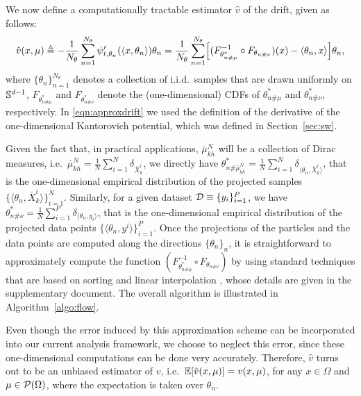 We now define a computationally tractable estimator $\hat{v}$ of the drift, given as follows:
\begin{align}
\hat{v}(x,\mu) \triangleq - \frac1{N_\theta} \sum_{n=1}^{N_\theta} \psi_{t, \theta_n}'(\langle x , \theta_n \rangle ) \theta_n = \frac1{N_\theta} \sum_{n=1}^{N_\theta} \Bigl[ (F_{\theta_{n\#\mu}^*}^{-1} \circ F_{\theta_{n\#\nu}}) (x) - \langle \theta_n, x\rangle \Bigr] \theta_n , \label{eqn:approxdrift}
\end{align}
where $\{\theta_n\}_{n=1}^{N_\theta}$ denotes a collection of i.i.d.\ samples that are drawn uniformly on $\mathbb{S}^{d-1}$, $F_{\theta_{n\#\mu}^*}$ and $F_{\theta_{n\#\nu}^*}$ denote the (one-dimensional) CDFs of $\theta_{n\#\mu}^*$ and $\theta_{n\#\nu}^*$, respectively. In \eqref{eqn:approxdrift} we used the definition of the derivative of the one-dimensional Kantorovich potential, which was defined in Section~\ref{sec:sw}. 




Given the fact that, in practical applications, $\bar{\mu}^N_{kh}$ will be a collection of Dirac measures, i.e.\ $\bar{\mu}^N_{kh} = \frac1{N} \sum_{i=1}^N \delta_{\bar{X}_{k}^i}$, we directly have $\theta_{n\#\bar{\mu}^N_{kh}}^* = \frac1{N} \sum_{i=1}^N \delta_{\langle \theta_n, \bar{X}_{k}^i \rangle} $, that is the one-dimensional empirical distribution of the projected samples $\{\langle \theta_n, \bar{X}_{k}^i \rangle\}_{i=1}^N$. Similarly, for a given dataset ${\cal D} \equiv \{y_i\}_{i=1}^P$, we have $\theta_{n\#\nu}^* = \frac1{N} \sum_{i=1}^P \delta_{\langle \theta_n, y_i \rangle} $, that is the one-dimensional empirical distribution of the projected data points $\{\langle \theta_n, y^i \rangle\}_{i=1}^P$. Once the projections of the particles and the data points are computed along the directions $\{\theta_n\}_n$, it is straightforward to approximately compute the function $(F_{\theta_{n\#\bar{\mu}}^*}^{-1} \circ F_{\theta_{n\#\nu}}) $ by using standard techniques that are based on sorting and linear interpolation , whose details are given in the supplementary document. The overall algorithm is illustrated in Algorithm~\ref{algo:flow}.


Even though the error induced by this approximation scheme can be incorporated into our current analysis framework, we choose to neglect this error, since these one-dimensional computations can be done very accurately. Therefore, $\hat{v}$ turns out to be an unbiased estimator of $v$, i.e.\ $\mathbb{E}[\hat{v}(x,\mu)] = v(x,\mu)$, for any $x\in \Omega$ and $\mu \in {\cal P}(\Omega)$, where the expectation is taken over $\theta_n$.











